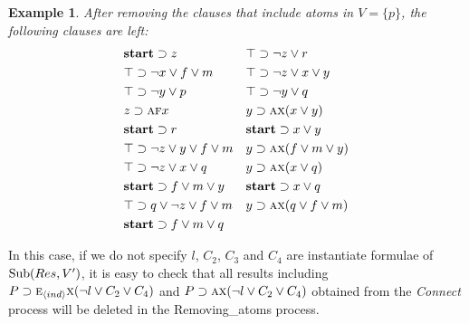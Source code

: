 \documentclass{article}
\newtheorem{example}{Example}
\begin{document}
\begin{example}\label{examp:remA}
After removing the clauses that include atoms in $V=\{p\}$, the following clauses are left:
\begin{align*}
& \textbf{start}\supset z &&  \top \supset \neg z \vee r\\
& \top \supset \neg x\vee f \vee m &&  \top \supset \neg z \vee x \vee y \\
&  \top \supset \neg y \vee p &&  \top \supset \neg y \vee q\\
&  z \supset \textsc{a} \textsc{f} x &&   y \supset \textsc{a} \textsc{x}(x\vee y) \\
& \textbf{start} \supset r && \textbf{start} \supset x \vee y \\
& \top \supset \neg z \vee y \vee f \vee m && y \supset \textsc{a}\textsc{x}(f\vee m\vee y)\\
& \top \supset \neg z \vee x \vee q && y \supset \textsc{a}\textsc{x}(x\vee q) \\
&  \textbf{start} \supset f\vee m \vee y && \textbf{start} \supset x \vee q \\
& \top \supset q \vee \neg z \vee f \vee m && y \supset \textsc{a}\textsc{x}(q \vee f\vee m) \\
& \textbf{start} \supset f\vee m \vee q
\end{align*}
\end{example}

In this case, if we do not specify $l$, $C_2$, $C_3$  and $C_4$ are instantiate formulae of  $\textrm{Sub}(Res, V')$, it is easy to check that all results including  $P\supset \textsc{e}_{{\langle{ind}\rangle}}\textsc{x} (\neg l \vee C_2 \vee C_4)$ and $P\supset \textsc{a} \textsc{x} (\neg l \vee C_2 \vee C_4)$ obtained from the \emph{Connect} process will be deleted in the Removing\_atoms process.
\end{document}
